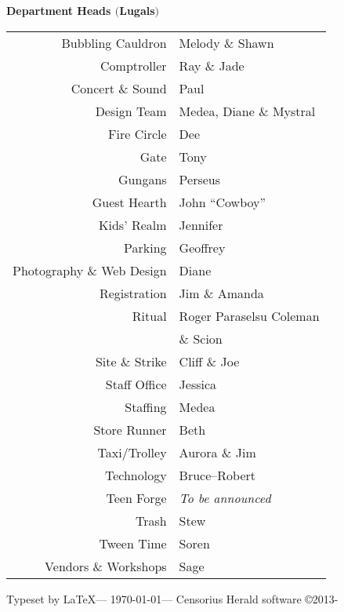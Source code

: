 \documentclass[9pt,twoside,openright,final,article]{memoir}
\renewcommand{\subsection}[1]{%
  \vspace{6pt}%
  \needspace{1.25in}%
  \begin{center}\textbf{\Large \beltanefamily #1}\end{center}

  \nopagebreak}
\begin{document}
\subsection{Department Heads $($Lugals$)$}
\begin{center}
  \begin{tabular}{rl}
    Bubbling Cauldron    & Melody \& Shawn \\
    Comptroller          & Ray \& Jade \\
    Concert \& Sound     & Paul \\
    Design Team          & Medea, Diane \& Mystral \\
    Fire Circle          & Dee \\
    Gate                 & Tony \\
    Gungans              & Perseus \\
    Guest Hearth         & John ``Cowboy'' \\
    Kids' Realm          & Jennifer \\
    Parking              & Geoffrey \\
    Photography \& Web Design & Diane \\
    Registration         & Jim \& Amanda \\
    Ritual               & Roger Paraselsu Coleman \hspace{3em} \\
                           & \& Scion \\
    Site \& Strike       & Cliff \& Joe \\
    Staff Office         & Jessica \\
    Staffing             & Medea \\
    Store Runner         & Beth \\
    Taxi/Trolley         & Aurora \& Jim \\
    Technology           & Bruce--Robert \\
    Teen Forge           & \textit{To be announced} \\
    Trash                & Stew \\
    Tween Time           & Soren \\
    Vendors \& Workshops & Sage \\
  \end{tabular}
\end{center}

\vfill

{\tiny Typeset by \LaTeX --- \today --- Censorius Herald software \copyright 2013-\festyear{}}
\end{document}

